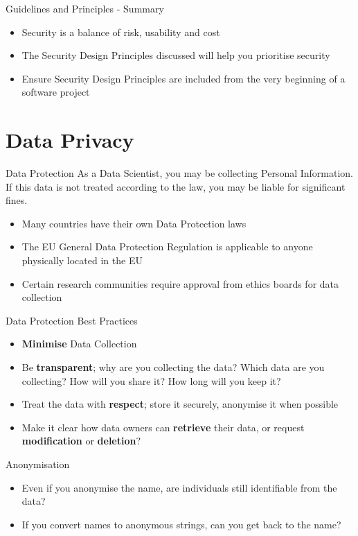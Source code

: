 \documentclass{beamer}
\begin{document}
\begin{frame}{Guidelines and Principles - Summary}
\begin{itemize}
\item Security is a balance of risk, usability and cost
\item The Security Design Principles discussed will help you prioritise security
\item Ensure Security Design Principles are included from the very beginning of a software project
\end{itemize}
\end{frame}

\section{Data Privacy}
\frame{\sectionpage}

\begin{frame}{Data Protection}
As a Data Scientist, you may be collecting Personal Information. If this data is not treated according to the law, you may be liable for significant fines. 
\begin{itemize}
\item Many countries have their own Data Protection laws
\item The EU General Data Protection Regulation is applicable to anyone physically located in the EU
\item Certain research communities require approval from ethics boards for data collection
\end{itemize}
\end{frame}

\begin{frame}{Data Protection}
Best Practices
\begin{itemize}
\item \textbf{Minimise} Data Collection
\item Be \textbf{transparent}; why are you collecting the data? Which data are you collecting? How will you share it? How long will you keep it?
\item Treat the data with \textbf{respect}; store it securely, anonymise it when possible
\item Make it clear how data owners can \textbf{retrieve} their data, or request \textbf{modification} or \textbf{deletion}?
\end{itemize}
\end{frame}

\begin{frame}{Anonymisation}
\begin{itemize}
\item Even if you anonymise the name, are individuals still identifiable from the data?
\item If you convert names to anonymous strings, can you get back to the name?  
\end{itemize}
\end{frame}
\end{document}
